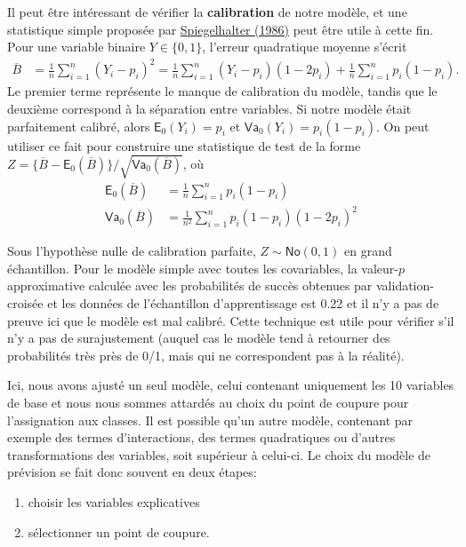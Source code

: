 \documentclass[
  11pt,
  letterpaper,
]{scrbook}
\providecommand{\tightlist}{%
  \setlength{\itemsep}{0pt}\setlength{\parskip}{0pt}}\usepackage{longtable,booktabs,array}
\theoremstyle{definition}
\theoremstyle{remark}
\begin{document}
Il peut être intéressant de vérifier la \textbf{calibration} de notre
modèle, et une statistique simple proposée par
\href{https://doi.org/10.1002/sim.4780050506}{Spiegelhalter (1986)} peut
être utile à cette fin. Pour une variable binaire \(Y \in \{0,1\}\),
l'erreur quadratique moyenne s'écrit \begin{align*}
\overline{B} &= \frac{1}{n} \sum_{i=1}^n (Y_i-p_i)^2 
=\frac{1}{n} \sum_{i=1}^n(Y_i-p_i)(1-2p_i) + \frac{1}{n} \sum_{i=1}^n p_i(1-p_i).
\end{align*} Le premier terme représente le manque de calibration du
modèle, tandis que le deuxième correspond à la séparation entre
variables. Si notre modèle était parfaitement calibré, alors
\(\mathsf{E}_0(Y_i)=p_i\) et \(\mathsf{Va}_0(Y_i) = p_i(1-p_i)\). On
peut utiliser ce fait pour construire une statistique de test de la
forme
\(Z = \{\overline{B} - \mathsf{E}_0(\overline{B})\}/\sqrt{\mathsf{Va}_0(\overline{B})}\),
où \begin{align*}
\mathsf{E}_0(\overline{B})&= \frac{1}{n} \sum_{i=1}^n p_i(1-p_i) \\
\mathsf{Va}_0(\overline{B})&= \frac{1}{n^2} \sum_{i=1}^n p_i(1-p_i)(1-2p_i)^2
\end{align*}

Sous l'hypothèse nulle de calibration parfaite,
\(Z \sim \mathsf{No}(0,1)\) en grand échantillon. Pour le modèle simple
avec toutes les covariables, la valeur-\(p\) approximative calculée avec
les probabilités de succès obtenues par validation-croisée et les
données de l'échantillon d'apprentissage est 0.22 et il n'y a pas de
preuve ici que le modèle est mal calibré. Cette technique est utile pour
vérifier s'il n'y a pas de surajustement (auquel cas le modèle tend à
retourner des probabilités très près de 0/1, mais qui ne correspondent
pas à la réalité).

Ici, nous avons ajusté un seul modèle, celui contenant uniquement les 10
variables de base et nous nous sommes attardés au choix du point de
coupure pour l'assignation aux classes. Il est possible qu'un autre
modèle, contenant par exemple des termes d'interactions, des termes
quadratiques ou d'autres transformations des variables, soit supérieur à
celui-ci. Le choix du modèle de prévision se fait donc souvent en deux
étapes:

\begin{enumerate}
\def\labelenumi{\arabic{enumi}.}
\tightlist
\item
  choisir les variables explicatives
\item
  sélectionner un point de coupure.
\end{enumerate}
\end{document}
